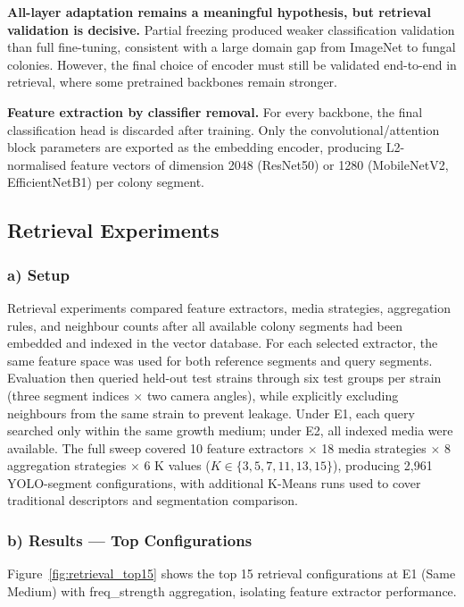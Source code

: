 \textbf{All-layer adaptation remains a meaningful hypothesis, but retrieval validation is decisive.} Partial freezing produced weaker classification validation than full fine-tuning, consistent with a large domain gap from ImageNet to fungal colonies. However, the final choice of encoder must still be validated end-to-end in retrieval, where some pretrained backbones remain stronger.

\textbf{Feature extraction by classifier removal.} For every backbone, the final classification head is discarded after training. Only the convolutional/attention block parameters are exported as the embedding encoder, producing L2-normalised feature vectors of dimension 2048 (ResNet50) or 1280 (MobileNetV2, EfficientNetB1) per colony segment.


\subsection{Retrieval Experiments}\label{retrieval-experiments}

\subsubsection{a) Setup}

Retrieval experiments compared feature extractors, media strategies, aggregation rules, and neighbour counts after all available colony segments had been embedded and indexed in the vector database. For each selected extractor, the same feature space was used for both reference segments and query segments. Evaluation then queried held-out test strains through six test groups per strain (three segment indices $\times$ two camera angles), while explicitly excluding neighbours from the same strain to prevent leakage. Under E1, each query searched only within the same growth medium; under E2, all indexed media were available. The full sweep covered 10 feature extractors $\times$ 18 media strategies $\times$ 8 aggregation strategies $\times$ 6 K values ($K \in \{3,5,7,11,13,15\}$), producing 2,961 YOLO-segment configurations, with additional K-Means runs used to cover traditional descriptors and segmentation comparison.

\subsubsection{b) Results --- Top Configurations}

Figure~\ref{fig:retrieval_top15} shows the top 15 retrieval configurations at E1 (Same Medium) with freq\_strength aggregation, isolating feature extractor performance.

